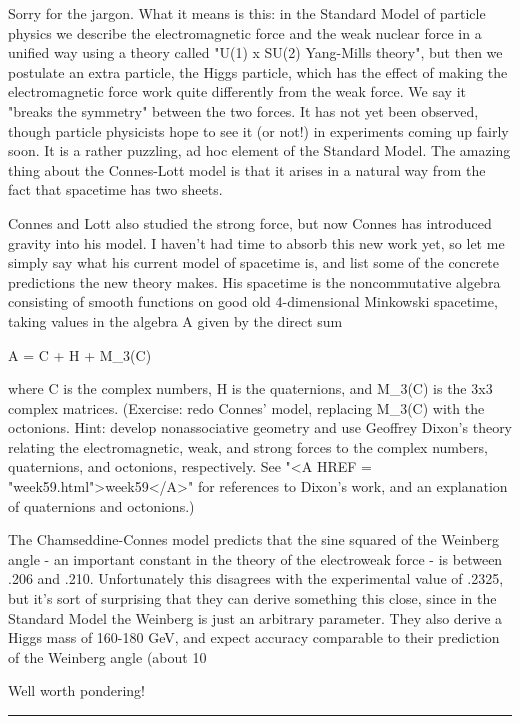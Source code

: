Sorry for the jargon.  What it means is this: in the Standard Model of
particle physics we describe the electromagnetic force and the weak
nuclear force in a unified way using a theory called "U(1) x SU(2)
Yang-Mills theory", but then we postulate an extra particle, the Higgs
particle, which has the effect of making the electromagnetic force work
quite differently from the weak force.  We say it "breaks the symmetry"
between the two forces.  It has not yet been observed, though particle
physicists hope to see it (or not!) in experiments coming up fairly
soon.  It is a rather puzzling, ad hoc element of the Standard Model.
The amazing thing about the Connes-Lott model is that it arises in a
natural way from the fact that spacetime has two sheets.

Connes and Lott also studied the strong force, but now Connes has
introduced gravity into his model.  I haven't had time to absorb this
new work yet, so let me simply say what his current model of spacetime
is, and list some of the concrete predictions the new theory makes.  
His spacetime is the noncommutative algebra consisting of smooth functions
on good old 4-dimensional Minkowski spacetime, taking values in the
algebra A given by the direct sum

                   A = C + H + M_3(C)

where C is the complex numbers, H is the quaternions, and M_3(C) is the
3x3 complex matrices.  (Exercise: redo Connes' model, replacing M_3(C)
with the octonions.  Hint: develop nonassociative geometry and use
Geoffrey Dixon's theory relating the electromagnetic, weak, and strong
forces to the complex numbers, quaternions, and octonions, respectively.
See "<A HREF = "week59.html">week59</A>" for references to Dixon's work, and an explanation of
quaternions and octonions.)

The Chamseddine-Connes model predicts that the sine squared of the
Weinberg angle - an important constant in the theory of the
electroweak force - is between .206 and .210.  Unfortunately this
disagrees with the experimental value of .2325, but it's sort of
surprising that they can derive something this close, since in the
Standard Model the Weinberg is just an arbitrary parameter.  They also
derive a Higgs mass of 160-180 GeV, and expect accuracy comparable to
their prediction of the Weinberg angle (about 10%

Well worth pondering!

\par\noindent\rule{\textwidth}{0.4pt}

